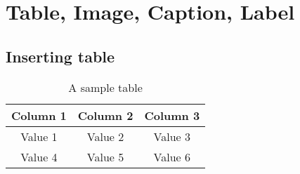 \chapter{Table, Image, Caption, Label}
\section{Inserting table}
\begin{table}[h]
    \centering
    \begin{tabular}{|c|c|c|}
        \hline
        Column 1 & Column 2 & Column 3\\
        \hline
        Value 1 & Value 2 & Value 3 \\
        \hline
        Value 4 & Value 5 & Value 6 \\
        \hline
    \end{tabular}
    \caption{A sample table}
    \label{tab:sample1}
\end{table}

